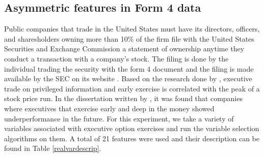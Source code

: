 \documentclass[twoside,11pt]{article}
\begin{document}
\subsection{Asymmetric features in Form 4 data}
Public companies that trade in the United States must have its directors, officers, and sharesholders owning more than 10\% of the firm file with the United States Securities and Exchange Commission a statement of ownership anytime they conduct a transaction with a company's stock. The filing is done by the individual trading the security with the form 4 document and the filing is made available by the SEC on its website \citep{SECWebsite}. Based on the research done by \citet{Cicero09}, executive trade on privileged information and early exercise is correlated with the peak of a stock price run. In the dissertation written by \citet{Wei06a}, it was found that companies where executives that exercise early and deep in the money showed underperformance in the future. For this experiment, we take a variety of variables associated with executive option exercises and run the variable selection algorithms on them. A total of 21 features were used and their description can be found in Table \ref{realvardescrip}. 
\end{document}
